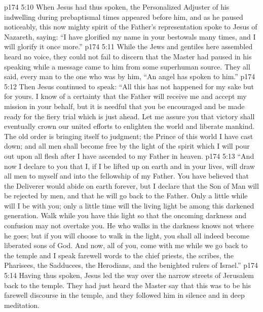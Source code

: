 \vs p174 5:10 When Jesus had thus spoken, the Personalized Adjuster of his indwelling during prebaptismal times appeared before him, and as he paused noticeably, this now mighty spirit of the Father’s representation spoke to Jesus of Nazareth, saying: “I have glorified my name in your bestowals many times, and I will glorify it once more.”
\vs p174 5:11 While the Jews and gentiles here assembled heard no voice, they could not fail to discern that the Master had paused in his speaking while a message came to him from some superhuman source. They all said, every man to the one who was by him, “An angel has spoken to him.”
\vs p174 5:12 Then Jesus continued to speak: \textcolor{ubdarkred}{“All this has not happened for my sake but for yours. I know of a certainty that the Father will receive me and accept my mission in your behalf, but it is needful that you be encouraged and be made ready for the fiery trial which is just ahead. Let me assure you that victory shall eventually crown our united efforts to enlighten the world and liberate mankind. The old order is bringing itself to judgment; the Prince of this world I have cast down; and all men shall become free by the light of the spirit which I will pour out upon all flesh after I have ascended to my Father in heaven.}
\vs p174 5:13 \textcolor{ubdarkred}{“And now I declare to you that I, if I be lifted up on earth and in your lives, will draw all men to myself and into the fellowship of my Father. You have believed that the Deliverer would abide on earth forever, but I declare that the Son of Man will be rejected by men, and that he will go back to the Father. Only a little while will I be with you; only a little time will the living light be among this darkened generation. Walk while you have this light so that the oncoming darkness and confusion may not overtake you. He who walks in the darkness knows not where he goes; but if you will choose to walk in the light, you shall all indeed become liberated sons of God. And now, all of you, come with me while we go back to the temple and I speak farewell words to the chief priests, the scribes, the Pharisees, the Sadducees, the Herodians, and the benighted rulers of Israel.”}
\vs p174 5:14 Having thus spoken, Jesus led the way over the narrow streets of Jerusalem back to the temple. They had just heard the Master say that this was to be his farewell discourse in the temple, and they followed him in silence and in deep meditation.
